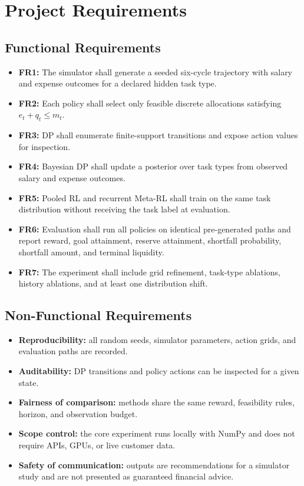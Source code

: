 \section{Project Requirements}\label{sec:project_requirements}

\subsection{Functional Requirements}
\begin{itemize}[noitemsep,topsep=2pt]
    \item \textbf{FR1:} The simulator shall generate a seeded six-cycle trajectory with salary and expense outcomes for a declared hidden task type.
    \item \textbf{FR2:} Each policy shall select only feasible discrete allocations satisfying $e_t+q_t\leq m_t$.
    \item \textbf{FR3:} DP shall enumerate finite-support transitions and expose action values for inspection.
    \item \textbf{FR4:} Bayesian DP shall update a posterior over task types from observed salary and expense outcomes.
    \item \textbf{FR5:} Pooled RL and recurrent Meta-RL shall train on the same task distribution without receiving the task label at evaluation.
    \item \textbf{FR6:} Evaluation shall run all policies on identical pre-generated paths and report reward, goal attainment, reserve attainment, shortfall probability, shortfall amount, and terminal liquidity.
    \item \textbf{FR7:} The experiment shall include grid refinement, task-type ablations, history ablations, and at least one distribution shift.
\end{itemize}

\subsection{Non-Functional Requirements}
\begin{itemize}[noitemsep,topsep=2pt]
    \item \textbf{Reproducibility:} all random seeds, simulator parameters, action grids, and evaluation paths are recorded.
    \item \textbf{Auditability:} DP transitions and policy actions can be inspected for a given state.
    \item \textbf{Fairness of comparison:} methods share the same reward, feasibility rules, horizon, and observation budget.
    \item \textbf{Scope control:} the core experiment runs locally with NumPy and does not require APIs, GPUs, or live customer data.
    \item \textbf{Safety of communication:} outputs are recommendations for a simulator study and are not presented as guaranteed financial advice.
\end{itemize}

